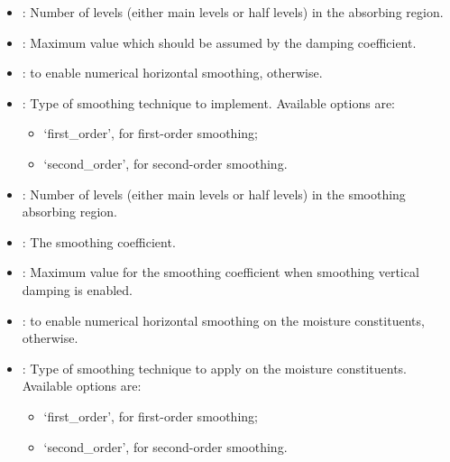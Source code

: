 \documentclass[letterpaper,10pt,english]{sphinxmanual}
\begin{document}
\begin{description}
\begin{itemize}
\item {} 
: Number of levels (either main levels or half levels) in the absorbing region.

\item {} 
: Maximum value which should be assumed by the damping coefficient.

\item {} 
:  to enable numerical horizontal smoothing,  otherwise.

\item {} 
: Type of smoothing technique to implement. Available options are:
\begin{itemize}
\item {} 
‘first\_order’, for first-order smoothing;

\item {} 
‘second\_order’, for second-order smoothing.

\end{itemize}

\item {} 
: Number of levels (either main levels or half levels)                 in the smoothing absorbing region.

\item {} 
: The smoothing coefficient.

\item {} 
: Maximum value for the smoothing coefficient when                 smoothing vertical damping is enabled.

\item {} 
:  to enable numerical horizontal smoothing             on the moisture constituents,  otherwise.

\item {} 
: Type of smoothing technique to apply on the moisture            constituents. Available options are:
\begin{itemize}
\item {} 
‘first\_order’, for first-order smoothing;

\item {} 
‘second\_order’, for second-order smoothing.

\end{itemize}


\end{itemize}
\end{description}
\end{document}
